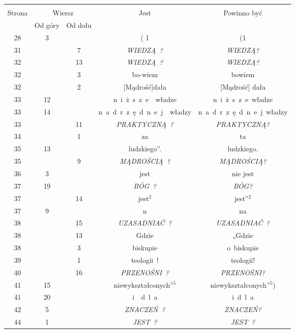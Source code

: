 \documentclass[a4paper,11pt]{article}
\begin{document}
\begin{center}

  \begin{tabular}{|c|c|c|c|c|}
    \hline
    & \multicolumn{2}{c|}{} & & \\
    Strona & \multicolumn{2}{c|}{Wiersz} & Jest
                              & Powinno być \\ \cline{2-3}
    & Od góry & Od dołu & & \\
    \hline
    28  &  3 & & ( 1 & (1 \\
    31  & &  7 & \textit{WIEDZĄ~?} & \textit{WIEDZĄ?} \\
    32  & & 13 & \textit{WIEDZĄ~?} & \textit{WIEDZĄ?} \\
    32  & &  3 & bo-wiem & bowiem \\
    32  & &  2 & [Mądrość]dała & [Mądrość] dała \\
    33  & 12 & & n~i~ż~s~z~e~~władze & n~i~ż~s~z~e\, władze \\
    33  & 14 & & n~a~d~r~z~ę~d~n~e~j~~władzy
           & n~a~d~r~z~ę~d~n~e~j\, władzy \\
    33  & & 11 & \textit{PRAKTYCZNĄ~?} & \textit{PRAKTYCZNĄ?} \\
    34  & &  1 & za & ta \\
    35  & 13 & & ludzkiego”. & ludzkiego. \\
    35  & &  9 & \textit{MĄDROŚCIĄ~?} & \textit{MĄDROŚCIĄ?} \\
    36  &  3 & & jest & nie jest \\
    37  & 19 & & \textit{BÓG~?} & \textit{BÓG?} \\
    37  & & 14 & jest$^{ 2 }$ & jest''$^{ 2 }$ \\
    37  &  9 & & n & na \\
    38  & & 15 & \textit{UZASADNIAĆ~?} & \textit{UZASADNIAĆ~?} \\
    38  & & 13 & Gdzie & „Gdzie \\
    38  & &  3 & biskupie & o~biskupie \\
    39  & &  1 & teologii~! & teologii! \\
    40  & & 16 & \textit{PRZENOŚNI~?} & \textit{PRZENOŚNI?} \\
    41  & 15 & & niewykształconych”$^{ 5 }$
           & niewykształconych”$^{ 5 }$) \\
    41  & 20 & & i~~d~l~a & i{}\, d~l~a \\
    42  &  5 & & \textit{ZNACZEŃ~?} & \textit{ZNACZEŃ?} \\
    44  &  1 & & \textit{JEST~?} & \textit{JEST~?} \\

\end{tabular}
\end{center}
\end{document}
